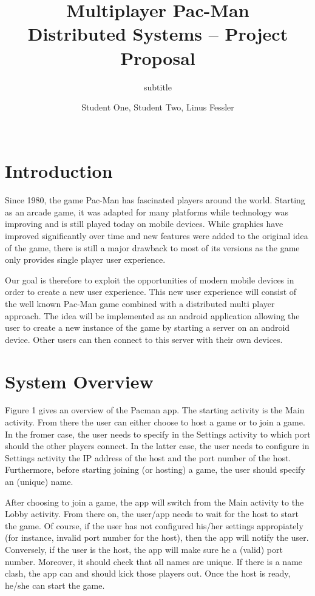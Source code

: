 \documentclass{report}
\title{Multiplayer Pac-Man\\
\normalsize{Distributed Systems -- Project Proposal}}
\subtitle{subtitle}
\author{
%
%
\alignauthor \normalsize{Student One,  Student Two, Linus Fessler}\\
	\affaddr{\normalsize{ETH ID-1 XX-XXX-XXX, ETH ID-2 XX-XXX-XXX, ETH ID-3 14-924-203}}\\
	\email{\normalsize{one@student.ethz.ch, two@student.ethz.ch, fesslerl@student.ethz.ch}}
}
\begin{document}
\maketitle

\section{Introduction}


Since 1980, the game Pac-Man has fascinated players around the world. 
Starting as an arcade game, it was adapted for many platforms while technology was improving and is still played today on mobile devices.
While graphics have improved significantly over time and new features were added to the original idea of the game, there is still a major drawback to most of its versions as the game only provides single player user experience.

 
Our goal is therefore to exploit the opportunities of modern mobile devices in order to create a new user experience. 
This new user experience will consist of the well known Pac-Man game combined with a distributed multi player approach.
The idea will be implemented as an android application allowing the user to create a new instance of the game by starting a server on an android device. 
Other users can then connect to this server with their own devices.



\section{System Overview}


Figure 1 gives an overview of the Pacman app. The starting activity is the Main activity. From there the user can either choose to host a game or to join a game. In the fromer case, the user needs to specify in the Settings activity to which port should the other players connect. In the latter case, the user needs to configure in Settings activity the IP address of the host and the port number of the host. Furthermore, before starting joining (or hosting) a game, the user should specify an (unique) name.


After choosing to join a game, the app will switch from the Main activity to the Lobby activity. From there on, the user/app needs to wait for the host to start the game. Of course, if the user has not configured his/her settings appropiately (for instance, invalid port number for the host), then the app will notify the user. Conversely, if the user is the host, the app will make sure he a (valid) port number. Moreover, it should check that all names are unique. If there is a name clash, the app can and should kick those players out. Once the host is ready, he/she can start the game.
\end{document}
